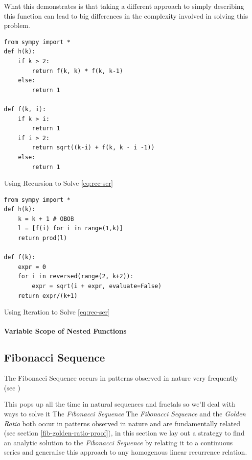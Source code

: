 \documentclass[11pt]{article}
\begin{document}
What this demonstrates is that taking a different approach to simply describing
this function can lead to big differences in the complexity involved in solving
this problem.

\begin{listing}[htbp]
\begin{verbatim}
from sympy import *
def h(k):
    if k > 2:
        return f(k, k) * f(k, k-1)
    else:
        return 1

def f(k, i):
    if k > i:
        return 1
    if i > 2:
        return sqrt((k-i) + f(k, k - i -1))
    else:
        return 1
\end{verbatim}
\caption{\label{rec-two}Using Recursion to Solve \eqref{eq:rec-ser}}
\end{listing}


\begin{listing}[htbp]
\begin{verbatim}
from sympy import *
def h(k):
    k = k + 1 # OBOB
    l = [f(i) for i in range(1,k)]
    return prod(l)

def f(k):
    expr = 0
    for i in reversed(range(2, k+2)):
        expr = sqrt(i + expr, evaluate=False)
    return expr/(k+1)
\end{verbatim}
\caption{\label{iter-two}Using Iteration to Solve \eqref{eq:rec-ser}}
\end{listing}

\paragraph{Variable Scope of Nested Functions}
\label{variable-scope-nested}

\subsection{Fibonacci Sequence}
\label{sec:org45d637d}
The Fibonacci Sequence occurs in patterns observed in nature very frequently (see
\cite{shellyallenFibonacciNature,benedettapalazzoNumbersNatureFibonacci2016,MinarovaNikoletta2014TFSN,NatureGoldenRatio2018,robertlambHowAreFibonacci2008,ronknottFibonacciNumbersGolden2016})

This pops up all the time in natural sequences and fractals so we'll deal with
ways to solve it The \emph{Fibonacci Sequence} The \emph{Fibonacci Sequence} and the
\emph{Golden Ratio} both occur in patterns observed in nature and are fundamentally
related (see section \ref{fib-golden-ratio-proof}), in this section we lay out a
strategy to find an analytic solution to the \emph{Fibonacci Sequence} by relating it
to a continuous series and generalise this approach to any homogenous linear
recurrence relation.
\end{document}
